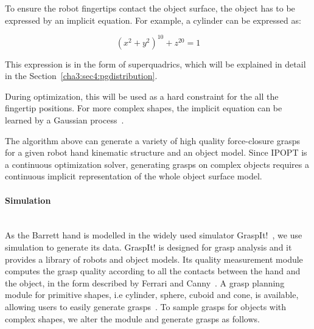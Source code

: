 To ensure the robot fingertips contact the object surface, the object has to be expressed by an implicit equation. For example, a cylinder can be expressed as:

\begin{equation}
{\left(x^2+y^2\right)}^{10}+z^{20} = 1
 \label{equ:cylinder}
\end{equation}

This expression is in the form of superquadrics, which will be explained in detail in the Section~\ref{cha3:sec4:pgdistribution}.

During optimization, this will be used as a hard constraint for the all the fingertip positions.
For more complex shapes, the implicit equation can be learned by a Gaussian process~\citep{el2013generation}.

The algorithm above can generate a variety of high quality force-closure grasps for a given robot hand kinematic structure and an object model. Since IPOPT is a continuous optimization solver, generating grasps on complex objects requires a continuous implicit representation of the whole object surface model.




\paragraph{Simulation}
~\\
As the Barrett hand is modelled in the widely used simulator GraspIt!~\citep{miller2004graspit}, we use simulation to generate its data. GraspIt! is designed for grasp analysis and it provides a library of robots and object models. Its quality measurement module computes the grasp quality according to all the contacts between the hand and the object, in the form described by Ferrari and Canny~\citep{ferrari1992planning}. A grasp planning module for primitive shapes, i.e cylinder, sphere, cuboid and cone, is available, allowing users to easily generate grasps~\citep{miller2003automatic}.
To sample grasps for objects with complex shapes, we alter the module and generate grasps as follows.

